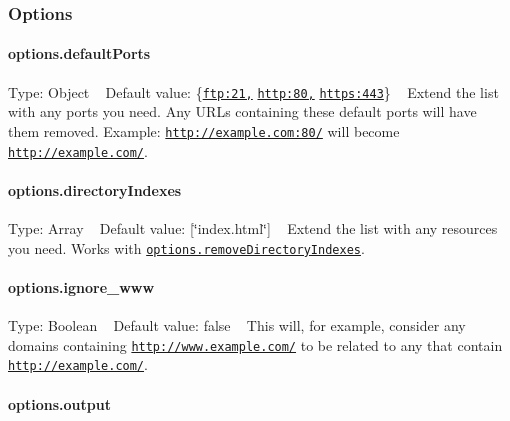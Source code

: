 \subsubsection*{Options}

\paragraph*{options.\+default\+Ports}

Type\+: {\ttfamily Object} ~\newline
Default value\+: {\ttfamily \{\href{ftp:21,}{\tt ftp\+:21,} \href{http:80,}{\tt http\+:80,} \href{https:443}{\tt https\+:443}\}} ~\newline
 Extend the list with any ports you need. Any U\+R\+Ls containing these default ports will have them removed. Example\+: {\ttfamily \href{http://example.com:80/}{\tt http\+://example.\+com\+:80/}} will become {\ttfamily \href{http://example.com/}{\tt http\+://example.\+com/}}.

\paragraph*{options.\+directory\+Indexes}

Type\+: {\ttfamily Array} ~\newline
Default value\+: {\ttfamily \mbox{[}\char`\"{}index.\+html\char`\"{}\mbox{]}} ~\newline
 Extend the list with any resources you need. Works with \href{#options.removeDirectoryIndexes}{\tt {\ttfamily options.\+remove\+Directory\+Indexes}}.

\paragraph*{options.\+ignore\+\_\+www}

Type\+: {\ttfamily Boolean} ~\newline
Default value\+: {\ttfamily false} ~\newline
 This will, for example, consider any domains containing {\ttfamily \href{http://www.example.com/}{\tt http\+://www.\+example.\+com/}} to be related to any that contain {\ttfamily \href{http://example.com/}{\tt http\+://example.\+com/}}.

\paragraph*{options.\+output}

